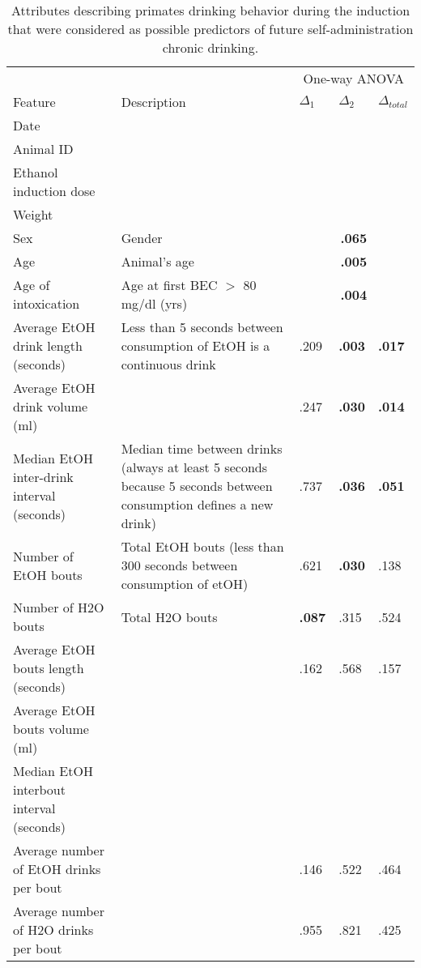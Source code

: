 \begin{table}
	\tiny
	\centering
	\caption{Attributes describing primates drinking behavior during the induction that were considered as possible predictors of future self-administration chronic drinking. \label{data-all-attributes}}
	\begin{tabular}{p{2in}p{2.6in}lll}
		\toprule
		&& \multicolumn{3}{c}{One-way ANOVA}\\ 
		\cmidrule(r){3-5}
		Feature & Description & $\Delta_1$ & $\Delta_2$ & $\Delta_{total}$ \\
		\midrule
		Date & \\
		Animal ID & \\
		Ethanol induction dose & \\
		Weight & \\
		Sex & Gender & \multicolumn{3}{c}{\textbf{.065}}\\
		Age & Animal's age & \multicolumn{3}{c}{\textbf{.005}}\\
		Age of intoxication & Age at first BEC $>$ 80 mg/dl (yrs) & \multicolumn{3}{c}{\textbf{.004}}\\
		
		\midrule
		Average EtOH drink length (seconds) & Less than 5 seconds between consumption of EtOH is a continuous drink & .209 & \textbf{.003} & \textbf{.017}\\
		Average EtOH drink volume (ml) && .247 & \textbf{.030} & \textbf{.014} \\
		Median EtOH inter-drink interval (seconds) & Median time between drinks (always at least 5 seconds because 5 seconds between consumption defines a new drink) & .737 &\textbf{.036} & \textbf{.051}\\
		
		\midrule
		Number of EtOH bouts & Total EtOH bouts (less than 300 seconds between consumption of etOH) & .621 & \textbf{.030} & .138\\
		Number of H2O bouts & Total H2O bouts & \textbf{.087} & .315 & .524\\
		Average EtOH bouts length (seconds) && .162 & .568 & .157 \\
		Average EtOH bouts volume (ml) & \\
		Median EtOH interbout interval (seconds) & \\
		Average number of EtOH drinks per bout && .146 & .522 & .464 \\
		Average number of H2O drinks per bout && .955 & .821 & .425 \\
		

\end{tabular}
\end{table}
